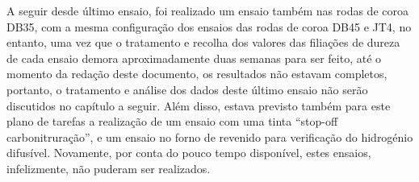 \newpage
\par
A seguir desde último ensaio, foi realizado um ensaio também nas rodas de coroa DB35, com a mesma configuração dos ensaios das rodas de coroa DB45 e JT4, no entanto, uma vez que o tratamento e recolha dos valores das filiações de dureza de cada ensaio demora aproximadamente duas semanas para ser feito, até o momento da redação deste documento, os resultados não estavam completos, portanto, o tratamento e análise dos dados deste último ensaio não serão discutidos no capítulo a seguir. Além disso, estava previsto também para este plano de tarefas a realização de um ensaio com uma tinta “stop-off carbonitruração”, e um ensaio no forno de revenido para verificação do hidrogénio difusível. Novamente, por conta do pouco tempo disponível, estes ensaios, infelizmente, não puderam ser realizados.